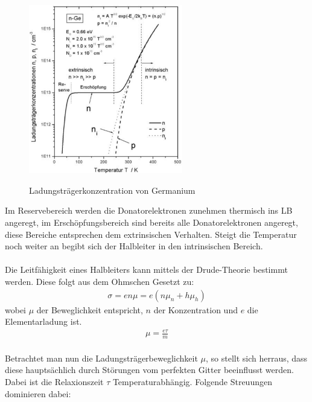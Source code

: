 \begin{figure}
    \centering
    \caption{Ladungsträgerkonzentration von Germanium}
    \includegraphics[width=0.6\textwidth]{./fig/ladung_ger.png}
    \label{fig:gerdot}
\end{figure}
Im Reservebereich werden die Donatorelektronen zunehmen thermisch ins LB angeregt, im Erschöpfungsbereich sind bereits alle Donatorelektronen angeregt, diese Bereiche entsprechen dem extrinsischen Verhalten. Steigt die Temperatur noch weiter an begibt sich der Halbleiter in den intrinsischen Bereich.
\\
\\
Die Leitfähigkeit eines Halbleiters kann mittels der Drude-Theorie bestimmt werden. Diese folgt aus dem Ohmschen Gesetzt zu:
\begin{align}
    \sigma = en\mu = e( n\mu_n + h \mu_h)
\end{align}
wobei $\mu$ der Beweglichkeit entspricht, $n$ der Konzentration und $e$ die Elementarladung ist.
\begin{align}
    \mu = \frac{e\tau}{m}
\end{align}
\\
Betrachtet man nun die Ladungsträgerbeweglichkeit $\mu$, so stellt sich herraus, dass diese hauptsächlich durch Störungen vom perfekten Gitter beeinflusst werden. Dabei ist die Relaxionszeit $\tau$ Temperaturabhängig. Folgende Streuungen dominieren dabei:
